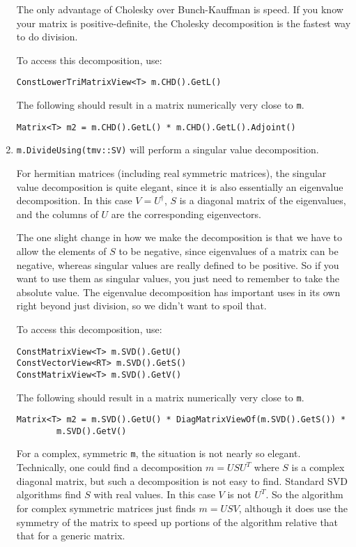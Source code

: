 \documentclass[twoside,letterpaper,11pt]{article}
\renewcommand{\tt}[1]{{\texttt {#1}}}
\begin{document}
\begin{enumerate}
The only advantage of Cholesky over Bunch-Kauffman is speed.  If you know your 
matrix is positive-definite, the Cholesky decomposition is the fastest way to 
do division.

To access this decomposition, use:
\begin{verbatim}
ConstLowerTriMatrixView<T> m.CHD().GetL()
\end{verbatim}
The following should result in a matrix numerically very close to \tt{m}.
\begin{verbatim}
Matrix<T> m2 = m.CHD().GetL() * m.CHD().GetL().Adjoint()
\end{verbatim}

\item
\tt{m.DivideUsing(tmv::SV)} will perform a singular value decomposition.

For hermitian matrices (including real symmetric matrices), 
the singular value decomposition is quite elegant,
since it is also essentially an eigenvalue decomposition.
In this case $V = U^\dagger$, $S$ is a diagonal matrix of the eigenvalues,
and the columns of $U$ are the corresponding eigenvectors.

The one slight change in how we make the decomposition
is that we have to allow the elements of $S$ to be negative, since eigenvalues of 
a matrix can be negative, whereas singular 
values are really defined to be positive.  So if you want to use them as
singular values, you just need to remember to take the absolute value.
The eigenvalue decomposition has important uses in 
its own right beyond just division, so we didn't want to spoil that.

To access this decomposition, use:
\begin{verbatim}
ConstMatrixView<T> m.SVD().GetU()
ConstVectorView<RT> m.SVD().GetS()
ConstMatrixView<T> m.SVD().GetV()
\end{verbatim}
The following should result in a matrix numerically very close to \tt{m}.
\begin{verbatim}
Matrix<T> m2 = m.SVD().GetU() * DiagMatrixViewOf(m.SVD().GetS()) * 
        m.SVD().GetV()
\end{verbatim}

For a complex, symmetric \tt{m}, the situation is not nearly so elegant.
Technically, one could find a decomposition $m = USU^T$ where $S$ is 
a complex diagonal matrix, but such a decomposition is not easy to find. 
Standard SVD algorithms find $S$ with real values.  In this case 
$V$ is not $U^T$.  So the algorithm for complex symmetric matrices 
just finds $m = USV$, although it does use the symmetry of the matrix to 
speed up portions of the algorithm relative that that for a generic matrix.


\end{enumerate}
\end{document}
